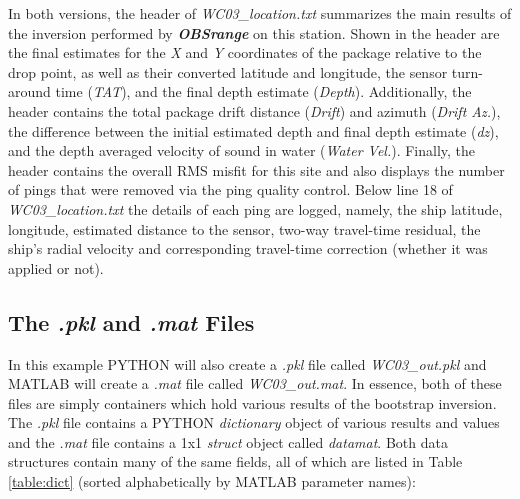 \documentclass[titlepage, 12pt]{article}
\begin{document}
  In both versions, the header of \textit{WC03\_location.txt} summarizes the main results of the inversion performed by \textbf{\textit{OBSrange}} on this station. Shown in the header are the final estimates for the \textit{X} and \textit{Y} coordinates of the package relative to the drop point, as well as their converted latitude and longitude, the sensor turn-around time (\textit{TAT}), and the final depth estimate (\textit{Depth}). Additionally, the header contains the total package drift distance (\textit{Drift}) and azimuth (\textit{Drift Az.}), the difference between the initial estimated depth and final depth estimate (\textit{dz}), and the depth averaged velocity of sound in water (\textit{Water Vel.}). Finally, the header contains the overall RMS misfit for this site and also displays the number of pings that were removed via the ping quality control. Below line 18 of \textit{WC03\_location.txt} the details of each ping are logged, namely, the ship latitude, longitude, estimated distance to the sensor, two-way travel-time residual, the ship's radial velocity and corresponding travel-time correction (whether it was applied or not).
 
  \subsection{The \textit{.pkl} and \textit{.mat} Files}
  In this example PYTHON will also create a \textit{.pkl} file called \textit{WC03\_out.pkl} and MATLAB will create a \textit{.mat} file called \textit{WC03\_out.mat}. In essence, both of these files are simply containers which hold various results of the bootstrap inversion. The \textit{.pkl} file contains a PYTHON \textit{dictionary} object of various results and values and the \textit{.mat} file contains a 1x1 \textit{struct} object called \textit{datamat}. Both data structures contain many of the same fields, all of which are listed in Table \ref{table:dict} (sorted alphabetically by MATLAB parameter names):
\end{document}
